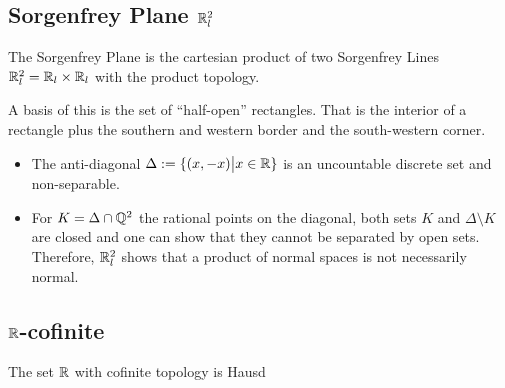 \subsection*{Sorgenfrey Plane $\mathbb{R}_l^{2}$}

The Sorgenfrey Plane is the cartesian product of two Sorgenfrey Lines $\mathbb{R}_l^{2} = \mathbb{R}_l \times \mathbb{R}_l$ with the product topology.


A basis of this is the set of ``half-open'' rectangles. That is the interior of a rectangle plus the southern and western border and the south-western corner.

\begin{itemize}
  \item The anti-diagonal $\Delta := \{(x,-x) \big\vert x \in \mathbb{R}\}$ is an uncountable discrete set and non-separable.
  \item For $K = \Delta \cap \mathbb{Q}^{2}$ the rational points on the diagonal, both sets $K$ and $\Delta \setminus K$ are closed and one can show that they cannot be separated by open sets.
    Therefore, $\mathbb{R}_l^{2}$ shows that a product of normal spaces is not necessarily normal.
\end{itemize}



\subsection*{$\mathbb{R}$-cofinite}

The set $\mathbb{R}$ with cofinite topology is Hausd


